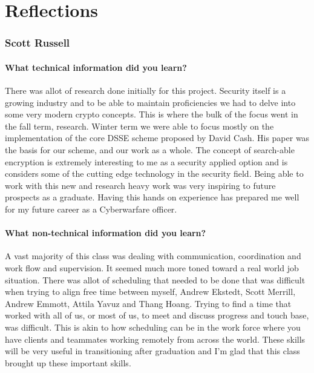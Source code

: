 
\chapter{Reflections}

\subsection{Scott Russell}

\subsubsection{What technical information did you learn?}
There was allot of research done initially for this project. Security itself is a growing industry and to be able to maintain proficiencies we had to delve into some very modern crypto concepts. This is where the bulk of the focus went in the fall term, research. Winter term we were able to focus mostly on the implementation of the core DSSE scheme proposed by David Cash. His paper was the basis for our scheme, and our work as a whole. The concept of search-able encryption is extremely interesting to me as a security applied option and is considers some of the cutting edge technology in the security field. Being able to work with this new and research heavy work was very inspiring to future prospects as a graduate. Having this hands on experience has prepared me well for my future career as a Cyberwarfare officer.
\subsubsection{What non-technical information did you learn?}
A vast majority of this class was dealing with communication, coordination and work flow and supervision. It seemed much more toned toward a real world job situation. There was allot of scheduling that needed to be done that was difficult when trying to align free time between myself, Andrew Ekstedt, Scott Merrill, Andrew Emmott, Attila Yavuz and Thang Hoang. Trying to find a time that worked with all of us, or most of us, to meet and discuss progress and touch base, was difficult. This is akin to how scheduling can be in the work force where you have clients and teammates working remotely from across the world. These skills will be very useful in transitioning after graduation and I'm glad that this class brought up these important skills.

